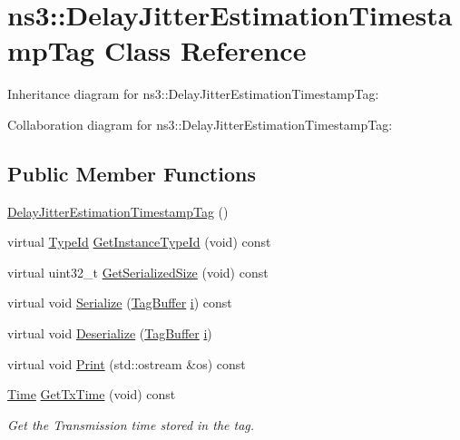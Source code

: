 \hypertarget{classns3_1_1DelayJitterEstimationTimestampTag}{}\section{ns3\+:\+:Delay\+Jitter\+Estimation\+Timestamp\+Tag Class Reference}
\label{classns3_1_1DelayJitterEstimationTimestampTag}


Inheritance diagram for ns3\+:\+:Delay\+Jitter\+Estimation\+Timestamp\+Tag\+:


Collaboration diagram for ns3\+:\+:Delay\+Jitter\+Estimation\+Timestamp\+Tag\+:
\subsection*{Public Member Functions}
\begin{DoxyCompactItemize}
\item 
\hyperlink{classns3_1_1DelayJitterEstimationTimestampTag_a1a2155d7953f873ae1171b89e57140b1}{Delay\+Jitter\+Estimation\+Timestamp\+Tag} ()
\item 
virtual \hyperlink{classns3_1_1TypeId}{Type\+Id} \hyperlink{classns3_1_1DelayJitterEstimationTimestampTag_a45e240e9566909f64bafcd5c9c7326b1}{Get\+Instance\+Type\+Id} (void) const 
\item 
virtual uint32\+\_\+t \hyperlink{classns3_1_1DelayJitterEstimationTimestampTag_ae9a3c247f4579940b77493a7a8142be5}{Get\+Serialized\+Size} (void) const 
\item 
virtual void \hyperlink{classns3_1_1DelayJitterEstimationTimestampTag_a2611249cc61392fe151d5f758565eed9}{Serialize} (\hyperlink{classns3_1_1TagBuffer}{Tag\+Buffer} \hyperlink{lte__uplink__power__control_8m_a6f6ccfcf58b31cb6412107d9d5281426}{i}) const 
\item 
virtual void \hyperlink{classns3_1_1DelayJitterEstimationTimestampTag_a30d366febfd7c00f87a9b2e5356b3135}{Deserialize} (\hyperlink{classns3_1_1TagBuffer}{Tag\+Buffer} \hyperlink{lte__uplink__power__control_8m_a6f6ccfcf58b31cb6412107d9d5281426}{i})
\item 
virtual void \hyperlink{classns3_1_1DelayJitterEstimationTimestampTag_ab0addee25619aa574ce1c79321f9e736}{Print} (std\+::ostream \&os) const 
\item 
\hyperlink{classns3_1_1Time}{Time} \hyperlink{classns3_1_1DelayJitterEstimationTimestampTag_aaf39ce65910037436d3be51a77fa6a4c}{Get\+Tx\+Time} (void) const 
\begin{DoxyCompactList}\small\item\em Get the Transmission time stored in the tag. \end{DoxyCompactList}\end{DoxyCompactItemize}
